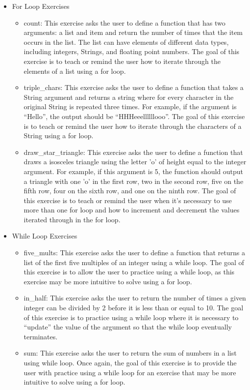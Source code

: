 \documentclass[10pt,twocolumn]{article}
\begin{document}
\begin{itemize}
\begin{itemize}
    \end{itemize}
    \item{For Loop Exercises}
    \begin{itemize}
        \item{count: This exercise asks the user to define a function that has two arguments: a list and item and return the number of times that the item occurs in the list. The list can have elements of different data types, including integers, Strings, and floating point numbers. The goal of this exercise is to teach or remind the user how to iterate through the elements of a list using a for loop.} 
        \item{triple\_chars: This exercise asks the user to define a function that takes a String argument  and returns a string where for every character in the original String is repeated three times. For example, if the argument is \enquote{Hello}, the output should be \enquote{HHHeeellllllooo}. The goal of this exercise is to teach or remind the user how to iterate through the characters of a String using a for loop.}
        \item{draw\_star\_triangle: This exercise asks the user to define a function that draws a isosceles triangle using the letter 'o' of height equal to the integer argument. For example, if this argument is 5, the function should output a triangle with one 'o' in the first row, two in the second row, five on the fifth row, four on the sixth row, and one on the ninth row. The goal of this exercise is to teach or remind the user when it's necessary to use more than one for loop and how to increment and decrement the values iterated through in the for loop.}
    \end{itemize}
    \item{While Loop Exercises}
    \begin{itemize}
        \item{five\_mults: This exercise asks the user to define a function that returns a list of the first five multiples of an integer using a while loop. The goal of this exercise is to allow the user to practice using a while loop, as this exercise may be more intuitive to solve using a for loop.}
        \item{in\_half: This exercise asks the user to return the number of times a given integer can be divided by 2 before it is less than or equal to 10. The goal of this exercise is to practice using a while loop where it is necessary to \enquote{update} the value of the argument so that the while loop eventually terminates.}
        \item{sum: This exercise asks the user to return the sum of numbers in a list using while loop. Once again, the goal of this exercise is to provide the user with practice using a while loop for an exercise that may be more intuitive to solve using a for loop.}
    \end{itemize}
\end{itemize}
\end{document}
